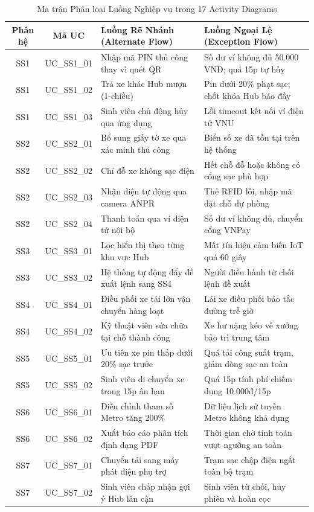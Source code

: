 \documentclass[12pt,a4paper]{article}
\begin{document}
\begin{table}[H]
    \centering
    \small
    \renewcommand{\arraystretch}{1.2}
    \caption{Ma trận Phân loại Luồng Nghiệp vụ trong 17 Activity Diagrams}
    \label{tab:act-matrix}
    \begin{tabularx}{\textwidth}{|c|c|X|X|}
        \hline
        \textbf{Phân hệ} & \textbf{Mã UC} & \textbf{Luồng Rẽ Nhánh (Alternate Flow)} & \textbf{Luồng Ngoại Lệ (Exception Flow)} \\
        \hline
        SS1 & UC\_SS1\_01 & Nhập mã PIN thủ công thay vì quét QR & Số dư ví không đủ 50.000 VNĐ; quá 15p tự hủy \\
        SS1 & UC\_SS1\_02 & Trả xe khác Hub mượn (1-chiều) & Pin dưới 20\% phạt sạc; chốt khóa Hub báo đầy \\
        SS1 & UC\_SS1\_03 & Sinh viên chủ động hủy qua ứng dụng & Lỗi timeout kết nối ví điện tử VNU \\
        \hline
        SS2 & UC\_SS2\_01 & Bổ sung giấy tờ xe qua xác minh thủ công & Biển số xe đã tồn tại trên hệ thống \\
        SS2 & UC\_SS2\_02 & Chỉ đỗ xe không sạc điện & Hết chỗ đỗ hoặc không có cổng sạc phù hợp \\
        SS2 & UC\_SS2\_03 & Nhận diện tự động qua camera ANPR & Thẻ RFID lỗi, nhập mã đặt chỗ dự phòng \\
        SS2 & UC\_SS2\_04 & Thanh toán qua ví điện tử nội bộ & Số dư ví không đủ, chuyển cổng VNPay \\
        \hline
        SS3 & UC\_SS3\_01 & Lọc hiển thị theo từng khu vực Hub & Mất tín hiệu cảm biến IoT quá 60 giây \\
        SS3 & UC\_SS3\_02 & Hệ thống tự động đẩy đề xuất lệnh sang SS4 & Người điều hành từ chối lệnh đề xuất \\
        \hline
        SS4 & UC\_SS4\_01 & Điều phối xe tải lớn vận chuyển hàng loạt & Lái xe điều phối báo tắc đường trễ giờ \\
        SS4 & UC\_SS4\_02 & Kỹ thuật viên sửa chữa tại chỗ thành công & Xe hư nặng kéo về xưởng bảo trì trung tâm \\
        \hline
        SS5 & UC\_SS5\_01 & Ưu tiên xe pin thấp dưới 20\% sạc trước & Quá tải công suất trạm, giảm dòng sạc an toàn \\
        SS5 & UC\_SS5\_02 & Sinh viên di chuyển xe trong 15p ân hạn & Quá 15p tính phí chiếm dụng 10.000đ/15p \\
        \hline
        SS6 & UC\_SS6\_01 & Điều chỉnh tham số Metro tăng 200\% & Dữ liệu lịch sử tuyến Metro không khả dụng \\
        SS6 & UC\_SS6\_02 & Xuất báo cáo phân tích định dạng PDF & Thời gian chờ tính toán vượt ngưỡng an toàn \\
        \hline
        SS7 & UC\_SS7\_01 & Chuyển tải sang máy phát điện phụ trợ & Trạm sạc chập điện ngắt toàn bộ trạm \\
        SS7 & UC\_SS7\_02 & Sinh viên chấp nhận gợi ý Hub lân cận & Sinh viên từ chối, hủy phiên và hoàn cọc \\
        \hline
    \end{tabularx}
\end{table}
\end{document}
